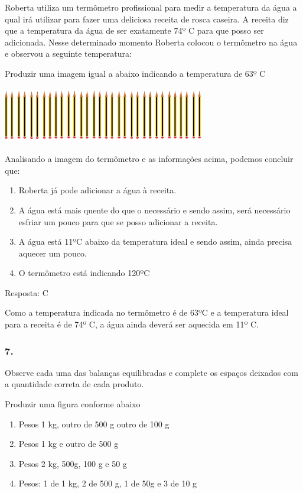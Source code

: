 Roberta utiliza um termômetro profissional para medir a temperatura da
água a qual irá utilizar para fazer uma deliciosa receita de rosca
caseira. A receita diz que a temperatura da água de ser exatamente 74º C
para que posso ser adicionada. Nesse determinado momento Roberta colocou
o termômetro na água e observou a seguinte temperatura:

Produzir uma imagem igual a abaixo indicando a temperatura de 63º C

\includegraphics[width=3.45684in,height=0.95833in]{media/image54.png}

\protect\hypertarget{_Hlk128407893}{}{}

Analisando a imagem do termômetro e as informações acima, podemos
concluir que:

\begin{enumerate}
\def\labelenumi{\alph{enumi})}
\item
  Roberta já pode adicionar a água à receita.
\item
  A água está mais quente do que o necessário e sendo assim, será
  necessário esfriar um pouco para que se posso adicionar a receita.
\item
  A água está 11ºC abaixo da temperatura ideal e sendo assim, ainda
  precisa aquecer um pouco.
\item
  O termômetro está indicando 120ºC
\end{enumerate}

Resposta: C

Como a temperatura indicada no termômetro é de 63ºC e a temperatura
ideal para a receita é de 74º C, a água ainda deverá ser aquecida em 11º
C.

\subsubsection{7.}\label{section-45}

Observe cada uma das balanças equilibradas e complete os espaços
deixados com a quantidade correta de cada produto.

Produzir uma figura conforme abaixo

\begin{enumerate}
\def\labelenumi{\alph{enumi})}
\item
  Pesos 1 kg, outro de 500 g outro de 100 g
\item
  Pesos 1 kg e outro de 500 g
\item
  Pesos 2 kg, 500g, 100 g e 50 g
\item
  Pesos: 1 de 1 kg, 2 de 500 g, 1 de 50g e 3 de 10 g
\end{enumerate}

